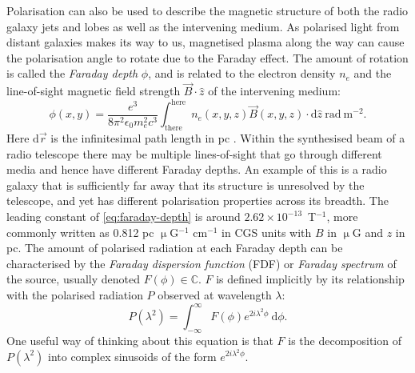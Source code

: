 \documentclass[11pt, a4paper]{book}
\newcommand{\defn}[1]{\emph{#1}}
\begin{document}
        Polarisation can also be used to describe the magnetic structure of both the radio galaxy jets and lobes as well as the intervening medium. As polarised light from distant galaxies makes its way to us, magnetised plasma along the way can cause the polarisation angle to rotate due to the Faraday effect. The amount of rotation is called the \defn{Faraday depth} $\phi$, and is related to the electron density $n_e$ and the line-of-sight magnetic field strength $\vec B \cdot \hat{z}$ of the intervening medium:
        \begin{equation}
            \label{eq:faraday-depth}
            \phi(x, y) = \frac{e^3}{8\pi^2\epsilon_0m_e^2c^3} \int_{\mathrm{there}}^{\mathrm{here}} n_e(x, y, z) \vec B(x, y, z) \cdot \mathrm{d}\hat{z}\ \mathrm{rad}\ \mathrm{m}^{-2}.
        \end{equation}
        Here $\mathrm{d}\vec r$ is the infinitesimal path length in pc \citep{brentjens_faraday_2005}. Within the synthesised beam of a radio telescope there may be multiple lines-of-sight that go through different media and hence have different Faraday depths. An example of this is a radio galaxy that is sufficiently far away that its structure is unresolved by the telescope, and yet has different polarisation properties across its breadth. The leading constant of \autoref{eq:faraday-depth} is around $2.62 \times 10^{-13}$~T$^{-1}$, more commonly written as 0.812 pc $\upmu$G$^{-1}$ cm$^{-1}$ in CGS units with $B$ in $\upmu$G and $z$ in pc. The amount of polarised radiation at each Faraday depth can be characterised by the \defn{Faraday dispersion function} (FDF) or \defn{Faraday spectrum} of the source, usually denoted $F(\phi) \in \mathbb C$. $F$ is defined implicitly by its relationship with the polarised radiation $P$ observed at wavelength $\lambda$:
        \begin{equation}
            \label{eq:faraday-dispersion-function}
            P(\lambda^2) = \int_{-\infty}^\infty F(\phi) e^{2i\lambda^2\phi}\ \mathrm{d}\phi.
        \end{equation}
        One useful way of thinking about this equation is that $F$ is the decomposition of $P(\lambda^2)$ into complex sinusoids of the form $e^{2i\lambda^2\phi}$.
\end{document}

